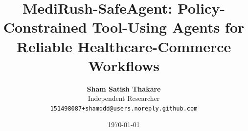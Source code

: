 \documentclass[10pt,twocolumn,letterpaper]{article}
\title{\textbf{MediRush-SafeAgent: Policy-Constrained Tool-Using Agents for Reliable Healthcare-Commerce Workflows}}
\author{
\textbf{Sham Satish Thakare}\\
Independent Researcher\\
{\tt\small 151498087+shamddd@users.noreply.github.com}
}
\date{\today}
\begin{document}
\maketitle

\begin{abstract}

\end{abstract}













\end{document}
